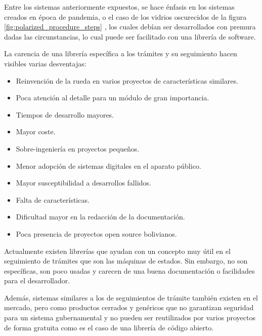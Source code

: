 Entre los sistemas anteriormente expuestos, se hace énfasis en los sistemas
creados en época de pandemia, o el caso de los vidrios oscurecidos de la figura
\ref{fig:polarized_procedure_steps} , los cuales debían ser desarrollados con
premura dadas las circunstancias, lo cual puede ser facilitado con una librería
de software.

La carencia de una librería específica a los trámites y su seguimiento hacen
visibles varias desventajas:

\begin{itemize}
    \item Reinvención de la rueda en varios proyectos de características
          similares.

    \item Poca atención al detalle para un módulo de gran importancia.

    \item Tiempos de desarrollo mayores.

    \item Mayor coste.

    \item Sobre-ingeniería en proyectos pequeños.

    \item Menor adopción de sistemas digitales en el aparato público.

    \item Mayor susceptibilidad a desarrollos fallidos.

    \item Falta de características.

    \item Dificultad mayor en la redacción de la documentación.

    \item Poca presencia de proyectos open source bolivianos.
\end{itemize}

Actualmente existen librerías que ayudan con un concepto muy útil en el
seguimiento de trámites que son las máquinas de estados. Sin embargo, no son
específicas, son poco usadas y carecen de una buena documentación o facilidades
para el desarrollador.

Además, sistemas similares a los de seguimientos de trámite también existen en
el mercado, pero como productos cerrados y genéricos que no garantizan seguridad
para un sistema gubernamental y no pueden ser reutilizados por varios proyectos
de forma gratuita como es el caso de una librería de código abierto.

